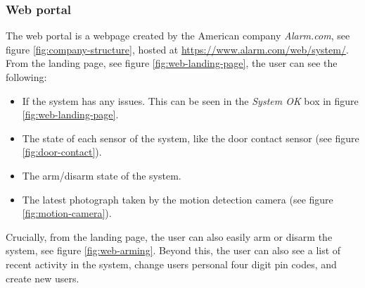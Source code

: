 \subsubsection{Web portal}
The web portal is a webpage created by the American company \textit{Alarm.com}, see figure \ref{fig:company-structure}, hosted at \url{https://www.alarm.com/web/system/}. From the landing page, see figure \ref{fig:web-landing-page}, the user can see the following:
\begin{itemize}
    \item If the system has any issues. This can be seen in the \textit{System OK} box in figure \ref{fig:web-landing-page}.
    \item The state of each sensor of the system, like the door contact sensor (see figure \ref{fig:door-contact}).
    \item The arm/disarm state of the system.
    \item The latest photograph taken by the motion detection camera (see figure \ref{fig:motion-camera}).
\end{itemize}
Crucially, from the landing page, the user can also easily arm or disarm the system, see figure \ref{fig:web-arming}. Beyond this, the user can also see a list of recent activity in the system, change users personal four digit pin codes, and create new users.

